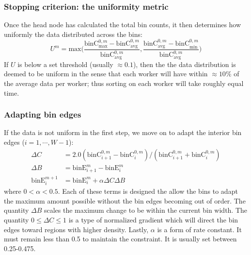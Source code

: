 \documentclass{article}
\begin{document}
\subsubsection{Stopping criterion: the uniformity metric}
Once the head node has calculated the total bin counts, it then determines how uniformly the data distributed across the bins:
\begin{equation}
	U^m = \textrm{max} \bigg( \dfrac{\textrm{binC}^{0,m}_{\textrm{max}} - \textrm{binC}^{0,m}_{\textrm{avg}}}{\textrm{binC}^{0,m}_{\textrm{avg}}}, \dfrac{\textrm{binC}^{0,m}_{\textrm{avg}} - \textrm{binC}^{0,m}_{\textrm{min}}}{\textrm{binC}^{0,m}_{\textrm{avg}}} \bigg)
\end{equation}
If $U$ is below a set threshold (usually $\approx 0.1$), then the the data distribution is deemed to be uniform in the sense that each worker will have within $\approx 10\%$ of the average data per worker; thus sorting on each worker will take roughly equal time.


\subsubsection{Adapting bin edges}
If the data is not uniform in the first step, we move on to adapt the interior bin edges ($i = 1, \cdots, W-1$):
\begin{equation}
	\begin{split}
		\Delta C & = 2.0 ( \textrm{binC}^{0,m}_{i+1} - \textrm{binC}^{0,m}_i ) / ( \textrm{binC}^{0,m}_{i+1} + \textrm{binC}^{0,m}_i ) \\
		\Delta B & = \textrm{binE}^m_{i+1} - \textrm{binE}^m_i \\
		\textrm{binE}^{m+1}_i & = \textrm{binE}^m_i + \alpha \Delta C \Delta B
	\end{split}
\end{equation}
where $0 < \alpha < 0.5$. Each of these terms is designed the allow the bins to adapt the maximum amount possible without the bin edges becoming out of order. The quantity $\Delta B$ scales the maximum change to be within the current bin width. The quantity $0 \le \Delta C \le 1$ is a type of normalized gradient which will direct the bin edges toward regions with higher density. Lastly, $\alpha$ is a form of rate constant. It must remain less than 0.5 to maintain the constraint. It is usually set between 0.25-0.475.
\end{document}

